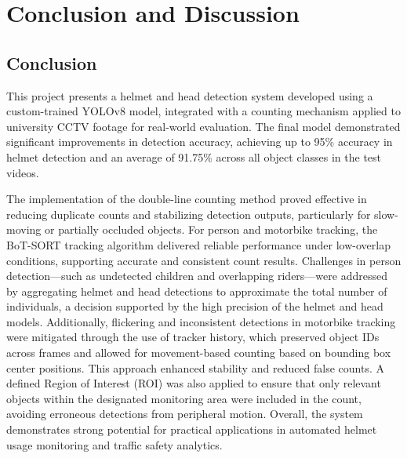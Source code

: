 \chapter{Conclusion and Discussion}
\section{Conclusion}
\setlength{\parindent}{2.5em}
This project presents a helmet and head detection system developed using a custom-trained YOLOv8 model, integrated with a counting mechanism applied to university CCTV footage for real-world evaluation. The final model demonstrated significant improvements in detection accuracy, achieving up to 95\% accuracy in helmet detection and an average of 91.75\% across all object classes in the test videos. 

The implementation of the double-line counting method proved effective in reducing duplicate counts and stabilizing detection outputs, particularly for slow-moving or partially occluded objects. For person and motorbike tracking, the BoT-SORT tracking algorithm delivered reliable performance under low-overlap conditions, supporting accurate and consistent count results. Challenges in person detection—such as undetected children and overlapping riders—were addressed by aggregating helmet and head detections to approximate the total number of individuals, a decision supported by the high precision of the helmet and head models. Additionally, flickering and inconsistent detections in motorbike tracking were mitigated through the use of tracker history, which preserved object IDs across frames and allowed for movement-based counting based on bounding box center positions. This approach enhanced stability and reduced false counts. A defined Region of Interest (ROI) was also applied to ensure that only relevant objects within the designated monitoring area were included in the count, avoiding erroneous detections from peripheral motion. Overall, the system demonstrates strong potential for practical applications in automated helmet usage monitoring and traffic safety analytics.

